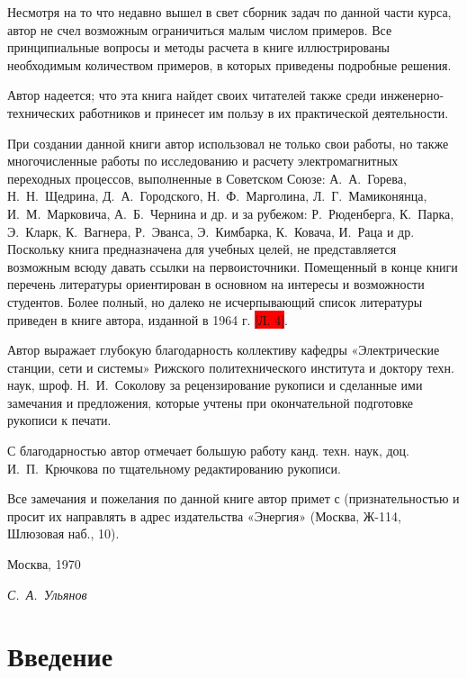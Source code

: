 Несмотря на то что недавно вышел в свет сборник задач по данной части курса, автор не счел возможным ограничиться малым числом примеров. Все принципиальные вопросы и методы расчета в книге иллюстрированы необходимым количеством примеров, в которых приведены подробные решения.

Автор надеется; что эта книга найдет своих читателей также среди инженерно-технических работников и принесет им пользу в их практической деятельности.

При создании данной книги автор использовал не только свои работы, но также многочисленные работы по исследованию и расчету электромагнитных переходных процессов, выполненные в Советском Союзе: А.~А.~Горева, Н.~Н.~Щедрина, Д.~А.~Городского, Н.~Ф.~Марголина, Л.~Г.~Мамиконянца, И.~М.~Марковича, А.~Б.~Чернина и др. и за рубежом: Р.~Рюденберга, К.~Парка, Э.~Кларк, К.~Вагнера, Р.~Эванса, Э.~Кимбарка, К.~Ковача, И.~Раца и др. Поскольку книга предназначена для учебных целей, не представляется возможным всюду давать ссылки на первоисточники. Помещенный в конце книги перечень литературы ориентирован в основном на интересы и возможности студентов. Более полный, но далеко не исчерпывающий список литературы приведен в книге автора, изданной в 1964 г. \colorbox{red}{[Л. 4]}.

Автор выражает глубокую благодарность коллективу кафедры «Электрические станции, сети и системы» Рижского политехнического института и доктору техн. наук, шроф. Н.~И.~Соколову за рецензирование рукописи и сделанные ими замечания и предложения, которые учтены при окончательной подготовке рукописи к печати.

С благодарностью автор отмечает большую работу канд. техн. наук, доц. И.~П.~Крючкова по тщательному редактированию рукописи.

Все замечания и пожелания по данной книге автор примет с (признательностью и просит их направлять в адрес издательства «Энергия» (Москва, Ж-114, Шлюзовая наб., 10).

\vspace{1pc}
\begin{minipage}{0.49\linewidth}
	Москва, 1970
\end{minipage}
\hfill
\begin{minipage}{0.49\linewidth}
	\flushright
	\textit{С.~А.~Ульянов}
\end{minipage}

\chapter*{Введение}
\label{chap:0 intro}

